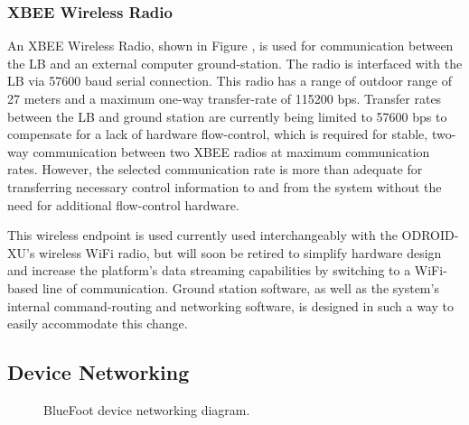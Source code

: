 			\subsubsection{XBEE Wireless Radio}

				An XBEE Wireless Radio, shown in Figure , is used for communication between the LB and an external computer ground-station. The radio is interfaced with the LB via 57600 baud serial connection. This radio has a range of outdoor range of 27 meters and a maximum one-way transfer-rate of 115200 bps. Transfer rates between the LB and ground station are currently being limited to 57600 bps to compensate for a lack of hardware flow-control, which is required for stable, two-way communication between two XBEE radios at maximum communication rates. However, the selected communication rate is more than adequate for transferring necessary control information to and from the system without the need for additional flow-control hardware.

				This wireless endpoint is used currently used interchangeably with the ODROID-XU's wireless WiFi radio, but will soon be retired to simplify hardware design and increase the platform's data streaming capabilities by switching to a WiFi-based line of communication. Ground station software, as well as the system's internal command-routing and networking software, is designed in such a way to easily accommodate this change.

		\subsection{Device Networking}

			\begin{figure}[h!]
				\centering
				\caption{BlueFoot device networking diagram.}
				\label{fig::dev_diagram}
			\end{figure}
			
